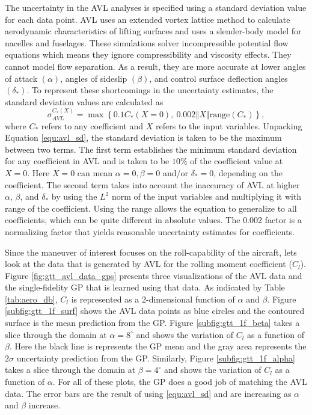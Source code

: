 The uncertainty in the AVL analyses is specified using a standard deviation value for each data point. 
AVL uses an extended vortex lattice method to calculate aerodynamic characteristics of lifting surfaces and uses a slender-body model for nacelles and fuselages. 
These simulations solver incompressible potential flow equations which means they ignore compressibility and viscosity effects. 
They cannot model flow separation.
As a result, they are more accurate at lower angles of attack $(\alpha)$, angles of sideslip $(\beta)$, and control surface deflection angles $(\delta_*)$.
To represent these shortcomings in the uncertainty estimates, the standard deviation values are calculated as
\begin{equation}\label{equ:avl_sd}
    \sigma_{AVL}^{C_*(X)} = \max \left \{ 0.1C_*(X=0),~0.002 \left \Vert X \right \Vert \mathrm{range}(C_*) \right \},
\end{equation}
where $C_*$ refers to any coefficient and $X$ refers to the input variables.
Unpacking Equation \ref{equ:avl_sd}, the standard deviation is taken to be the maximum between two terms.
The first term establishes the minimum standard deviation for any coefficient in AVL and is taken to be $10\%$ of the coefficient value at $X =0$. 
Here $X=0$ can mean $\alpha=0, \beta=0$ and/or $\delta_* = 0$, depending on the coefficient.
The second term takes into account the inaccuracy of AVL at higher $\alpha$, $\beta$, and $\delta_*$ by using the $L^2$ norm of the input variables and multiplying it with range of the coefficient.
Using the range allows the equation to generalize to all coefficients, which can be quite different in absolute values.
The $0.002$ factor is a normalizing factor that yields reasonable uncertainty estimates for coefficients.

Since the maneuver of interest focuses on the roll-capability of the aircraft, lets look at the data that is generated by AVL for the rolling moment coefficient ($C_l$).
Figure \ref{fig:gtt_avl_data_gps} presents three visualizations of the AVL data and the single-fidelity GP that is learned using that data. 
As indicated by Table \ref{tab:aero_db}, $C_l$ is represented as a 2-dimensional function of $\alpha$ and $\beta$. 
Figure \ref{subfig:gtt_1f_surf} shows the AVL data points as blue circles and the contoured surface is the mean prediction from the GP. 
Figure \ref{subfig:gtt_1f_beta} takes a slice through the domain at $\alpha = 8^\circ$ and shows the variation of $C_l$ as a function of $\beta$. 
Here the black line is represents the GP mean and the gray area represents the $2\sigma$ uncertainty prediction from the GP.
Similarly, Figure \ref{subfig:gtt_1f_alpha} takes a slice through the domain at $\beta = 4^\circ$ and shows the variation of $C_l$ as a function of $\alpha$. 
For all of these plots, the GP does a good job of matching the AVL data. 
The error bars are the result of using \ref{equ:avl_sd} and are increasing as $\alpha$ and $\beta$ increase. 

